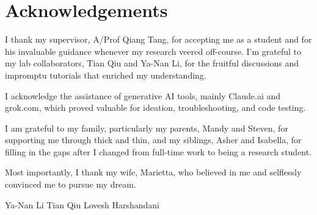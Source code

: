 \chapter*{Acknowledgements}
I thank my supervisor, A/Prof Qiang Tang, for accepting me as a student and for his invaluable guidance whenever my research veered off-course. I'm grateful to my lab collaborators, Tian Qiu and Ya-Nan Li, for the fruitful discussions and impromptu tutorials that enriched my understanding.

I acknowledge the assistance of generative AI tools, mainly Claude.ai and grok.com, which proved valuable for ideation, troubleshooting, and code testing.

I am grateful to my family, particularly my parents, Mandy and Steven, for supporting me through thick and thin, and my siblings, Asher and Isabella, for filling in the gaps after I changed from full-time work to being a research student.

Most importantly, I thank my wife, Marietta, who believed in me and selflessly convinced me to pursue my dream.

Ya-Nan Li
Tian Qiu
Lovesh Harshandani